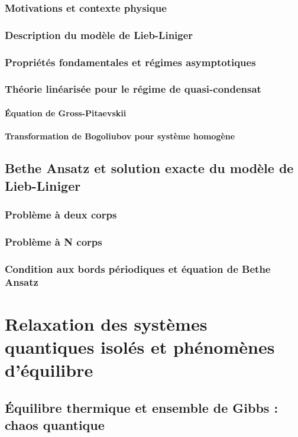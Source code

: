 \section{Motivations et contexte physique}
\section{Description du modèle de Lieb-Liniger}

\section{Propriétés fondamentales et régimes asymptotiques}
\section{Théorie linéarisée pour le régime de quasi-condensat}
\subsection{Équation de Gross-Pitaevskii}
\subsection{Transformation de Bogoliubov pour système homogène}

\chapter{Bethe Ansatz et solution exacte du modèle de Lieb-Liniger}
\minitoc
\section{Problème à deux corps}
\section{Problème à N corps}
\section{Condition aux bords périodiques et équation de Bethe Ansatz}

\part{Relaxation des systèmes quantiques isolés et phénomènes d'équilibre}

\chapter{Équilibre thermique et ensemble de Gibbs : chaos quantique}
\minitoc
